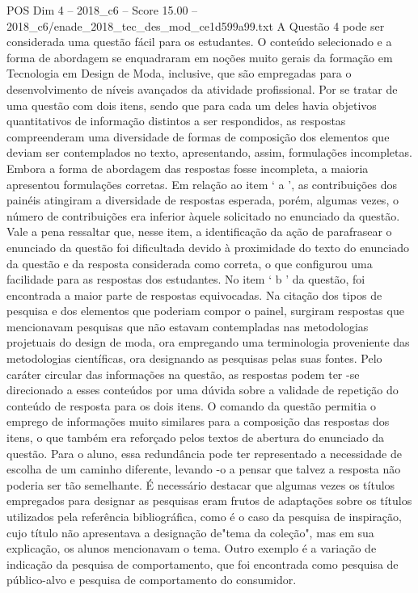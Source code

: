 \begin{textsample}{POS Dim 4 – 2018\_c6 – Score 15.00 – 2018\_c6/enade\_2018\_tec\_des\_mod\_ce1d599a99.txt}
A Questão 4 pode ser considerada uma questão fácil para os estudantes.
O conteúdo selecionado e a forma de abordagem se enquadraram em noções muito gerais da formação em Tecnologia em Design de Moda, inclusive, que são empregadas para o desenvolvimento de níveis avançados da atividade profissional.
Por se tratar de uma questão com dois itens, sendo que para cada um deles havia objetivos quantitativos de informação distintos a ser respondidos, as respostas compreenderam uma diversidade de formas de composição dos elementos que deviam ser contemplados no texto, apresentando, assim, formulações incompletas.
Embora a forma de abordagem das respostas fosse incompleta, a maioria apresentou formulações corretas.
Em relação ao item ‘ a ’, as contribuições dos painéis atingiram a diversidade de respostas esperada, porém, algumas vezes, o número de contribuições era inferior àquele solicitado no enunciado da questão.
Vale a pena ressaltar que, nesse item, a identificação da ação de parafrasear o enunciado da questão foi dificultada devido à proximidade do texto do enunciado da questão e da resposta considerada como correta, o que configurou uma facilidade para as respostas dos estudantes.
No item ‘ b ’ da questão, foi encontrada a maior parte de respostas equivocadas.
Na citação dos tipos de pesquisa e dos elementos que poderiam compor o painel, surgiram respostas que mencionavam pesquisas que não estavam contempladas nas metodologias projetuais do design de moda, ora empregando uma terminologia proveniente das metodologias científicas, ora designando as pesquisas pelas suas fontes.
Pelo caráter circular das informações na questão, as respostas podem ter -se direcionado a esses conteúdos por uma dúvida sobre a validade de repetição do conteúdo de resposta para os dois itens.
O comando da questão permitia o emprego de informações muito similares para a composição das respostas dos itens, o que também era reforçado pelos textos de abertura do enunciado da questão.
Para o aluno, essa redundância pode ter representado a necessidade de escolha de um caminho diferente, levando -o a pensar que talvez a resposta não poderia ser tão semelhante.
É necessário destacar que algumas vezes os títulos empregados para designar as pesquisas eram frutos de adaptações sobre os títulos utilizados pela referência bibliográfica, como é o caso da pesquisa de inspiração, cujo título não apresentava a designação de"tema da coleção", mas em sua explicação, os alunos mencionavam o tema.
Outro exemplo é a variação de indicação da pesquisa de comportamento, que foi encontrada como pesquisa de público-alvo e pesquisa de comportamento do consumidor.

\end{textsample}
